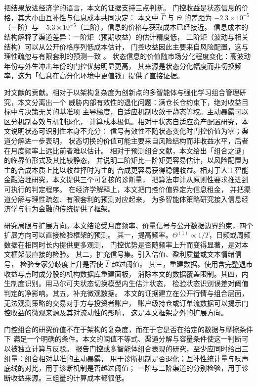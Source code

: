 把结果放进经济学的语言，本文的证据支持三点判断。
门控收益是状态信息的价格，其大小由互补性与信息成本共同决定：
本文中 $\hat\Gamma$ 与 $\Theta$ 的差距为 $-2.3\times10^{-5}$（一阶）与
$-5.3\times10^{-5}$（二阶），信息的价格与获取成本已经接近。
信息成本的结构解释了渠道差异：一阶矩（预期收益）的估计精度低，
二阶矩（波动与相关结构）可以从公开价格序列低成本估计，
门控收益因此主要来自风险配置，这与理性疏忽与有限套利的预测一致
\cite{sims2003,shleifer1997}。
状态信息的价值随市场分化程度变化：高波动年份与外生冲击年份的门控优势明显更高，
其来源是状态分化幅度而非切换频率，这为「信息在高分化环境中更值钱」提供了直接证据。

对文献的贡献。相对于以架构复杂度为创新点的多智能体与强化学习组合管理研究，本文分离出一个
威胁内部有效性的退化问题：满仓长仓约束下，绝对收益目标中与决策无关的基准项
主导梯度，自适应机制收敛于静态等权。主动暴露可以区分机制奏效与机制退化，
计算成本极低。相对于状态自适应资产配置研究，本文说明状态可识别性本身不充分：
信号有效性不随状态变化时门控价值为零；渠道分解进一步表明，
状态切换的价值可能主要来自风险结构而非收益水平，后者在月度频率上远比前者难以估计。
相对于预测组合文献，本文给出「组合之谜」的临界值形式及其比较静态，
并说明二阶矩比一阶矩更容易估计，以风险配置为主的合成本质上比以收益择时为主的
合成更容易获得稳健收益。相对于人工智能金融治理研究，本文提供三个可复核的诊断量，
把算法审计从原则性要求推进到可执行的判定程序。
在经济学解释上，本文把门控价值界定为信息租金，
并把渠道分解与理性疏忽、有限套利的预测对应起来，
为多智能体策略研究接入信息经济学与行为金融的传统提供了框架。

研究局限与扩展方向。本文结论受月度频率、价量信号与公开数据边界约束，四个扩展方向可以直接检验框架的预测。
其一，提高频率。$\Theta^{(1)}\propto1/T$，日频或周频数据在相同时长内提供更多观测，
门控优势是否随频率上升而变得显著，是对本文框架最直接的检验。
其二，扩充信号集。引入估值、盈利质量或文本情绪信号，
检验专家分歧度上升是否使 $\hat\Gamma$ 越过阈值。
其三，重建数据。使用含完整退市收益与点时成分股的机构数据库重建面板，
消除本文的数据覆盖限制。其四，内生制度识别。用马尔可夫状态切换模型内生估计状态，
检验状态识别误差对阈值判定的净影响。其五，补充微观数据。
本文的证据建立在公开行情与组合层面，无法观测策略的交易对手方与投资者账户，
账户级持仓或订单流数据可以揭示门控收益的微观来源及其对流动性的影响，
这是本文框架之外的扩展方向。

门控组合的研究价值不在于架构的复杂度，而在于它是否在给定的数据与摩擦条件下
满足一个明确的条件。本文的阈值不等式、渠道分解与容量条件使这一判断可以被独立计算与反驳。
报告门控或多智能体组合表现的研究，至少应同时给出三组量：组合相对基准的主动暴露，
用于诊断机制是否退化；互补性统计量与噪声底线的对比，用于诊断机制是否越过阈值；
一阶与二阶渠道的分别检验，用于诊断收益来源。三组量的计算成本都很低。
